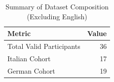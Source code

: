 \begin{table}
\caption{Summary of Dataset Composition (Excluding English)}
\label{tab:dataset_metadata}
\begin{tabular}{lr}
\toprule
Metric & Value \\
\midrule
Total Valid Participants & 36 \\
Italian Cohort & 17 \\
German Cohort & 19 \\
\bottomrule
\end{tabular}
\end{table}
